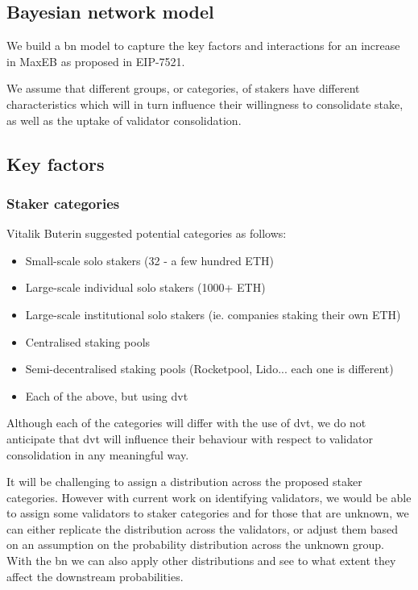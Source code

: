\subsection{Bayesian network model}
We build a \gls{bn} model to capture the key factors and interactions for an increase in MaxEB as proposed in EIP-7521.

We assume that different groups, or categories, of stakers have different characteristics which will in turn influence their willingness to consolidate stake, as well as the uptake of validator consolidation.

\subsection{Key factors}

\subsubsection*{Staker categories}
Vitalik Buterin suggested potential categories as follows:
\begin{itemize}
\item Small-scale solo stakers (32 - a few hundred ETH)
\item Large-scale individual solo stakers (1000+ ETH)
\item Large-scale institutional solo stakers (ie. companies staking their own ETH)
\item Centralised staking pools
\item Semi-decentralised staking pools (Rocketpool, Lido... each one is different)
\item Each of the above, but using \gls{dvt}
\end{itemize}

Although each of the categories will differ with the use of \gls{dvt}, we do not anticipate that \gls{dvt} will influence their behaviour with respect to validator consolidation in any meaningful way. 

It will be challenging to assign a distribution across the proposed staker categories. However with current work on identifying validators, we would be able to assign some validators to staker categories and for those that are unknown, we can either replicate the distribution across the validators, or adjust them based on an assumption on the probability distribution across the unknown group. With the \gls{bn} we can also apply other distributions and see to what extent they affect the downstream probabilities.

